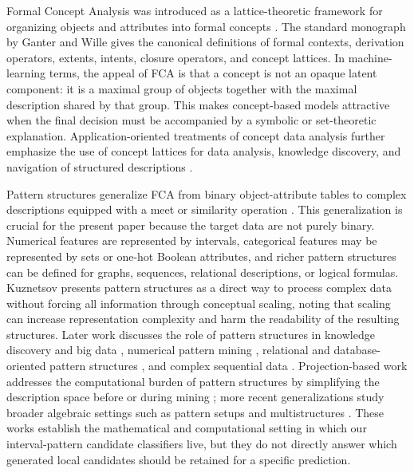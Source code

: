 \documentclass[11pt]{article}
\begin{document}
Formal Concept Analysis was introduced as a lattice-theoretic framework for
organizing objects and attributes into formal concepts
\cite{wille2009restructuring}. The standard monograph by Ganter and Wille
\cite{ganter1999formal} gives the canonical definitions of formal contexts,
derivation operators, extents, intents, closure operators, and concept
lattices. In machine-learning terms, the appeal of FCA is that a concept is
not an opaque latent component: it is a maximal group of objects together
with the maximal description shared by that group. This makes concept-based
models attractive when the final decision must be accompanied by a symbolic
or set-theoretic explanation. Application-oriented treatments of concept data
analysis further emphasize the use of concept lattices for data analysis,
knowledge discovery, and navigation of structured descriptions
\cite{carpineto2004concept,ignatov2014introduction}.

Pattern structures generalize FCA from binary object-attribute tables to
complex descriptions equipped with a meet or similarity operation
\cite{ganter2001pattern}. This generalization is crucial for the present
paper because the target data are not purely binary. Numerical features are
represented by intervals, categorical features may be represented by sets or
one-hot Boolean attributes, and richer pattern structures can be defined for
graphs, sequences, relational descriptions, or logical formulas. Kuznetsov
\cite{kuznetsov2009pattern} presents pattern structures as a direct way to
process complex data without forcing all information through conceptual
scaling, noting that scaling can increase representation complexity and harm
the readability of the resulting structures. Later work discusses the role of
pattern structures in knowledge discovery and big data
\cite{kuznetsov2013fitting,kaytoue2015pattern}, numerical pattern mining
\cite{article}, relational and database-oriented pattern structures
\cite{baixeries2014characterization,kotters2020conjunctive}, and complex
sequential data \cite{buzmakov2016mining}. Projection-based work addresses
the computational burden of pattern structures by simplifying the description
space before or during mining \cite{buzmakov2015revisiting}; more recent
generalizations study broader algebraic settings such as pattern setups and
multistructures \cite{belfodil2020pattern}. These works establish the
mathematical and computational setting in which our interval-pattern
candidate classifiers live, but they do not directly answer which generated
local candidates should be retained for a specific prediction.
\end{document}
